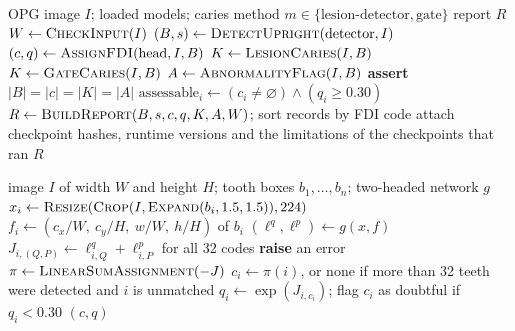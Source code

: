 \begin{algorithm}[!htbp]
\caption{End-to-end inference (\texttt{run\_pipeline})}
\label{alg:pipeline}
\begin{algorithmic}[1]
\Require OPG image $I$; loaded models; caries method $m \in \{\text{lesion-detector}, \text{gate}\}$
\Ensure report $R$
\State $W \gets \textsc{CheckInput}(I)$ 
\State $(B, s) \gets \textsc{DetectUpright}(\text{detector}, I)$ 
\State $(c, q) \gets \textsc{AssignFDI}(\text{head}, I, B)$ 
  \State $K \gets \textsc{LesionCaries}(I, B)$ 
\Else
  \State $K \gets \textsc{GateCaries}(I, B)$ 
\EndIf
\State $A \gets \textsc{AbnormalityFlag}(I, B)$ 
\State \textbf{assert} $|B| = |c| = |K| = |A|$ 
  \State $\text{assessable}_i \gets (c_i \neq \varnothing) \wedge (q_i \geq 0.30)$
\EndFor
\State $R \gets \textsc{BuildReport}(B, s, c, q, K, A, W)$; sort records by FDI code
\State attach checkpoint hashes, runtime versions and the limitations of the checkpoints that ran
\State \Return $R$
\end{algorithmic}
\end{algorithm}

\begin{algorithm}[!htbp]
\caption{One-to-one FDI assignment (\texttt{assign\_fdi\_head})}
\label{alg:fdi}
\begin{algorithmic}[1]
\Require image $I$ of width $W$ and height $H$; tooth boxes $b_1,\dots,b_n$; two-headed network $g$
  \State $x_i \gets \textsc{Resize}(\textsc{Crop}(I, \textsc{Expand}(b_i, 1.5, 1.5)), 224)$
  \State $f_i \gets (c_x/W,\ c_y/H,\ w/W,\ h/H)$ of $b_i$
\EndFor
\State $(\ell^{q}, \ell^{p}) \gets g(x, f)$ 
\State $J_{i,(Q,P)} \gets \ell^{q}_{i,Q} + \ell^{p}_{i,P}$ for all 32 codes 
 \State \textbf{raise} an error \EndIf
\State $\pi \gets \textsc{LinearSumAssignment}(-J)$ 
  \State $c_i \gets \pi(i)$, or none if more than 32 teeth were detected and $i$ is unmatched
  \State $q_i \gets \exp(J_{i,c_i})$; flag $c_i$ as doubtful if $q_i < 0.30$
\EndFor
\State \Return $(c, q)$
\end{algorithmic}
\end{algorithm}

